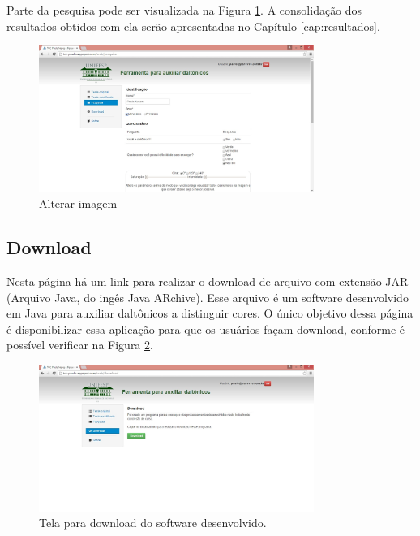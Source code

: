 \documentclass[	12pt, Times, openright, twoside, a4paper, english, brazil]{abntex2}
\begin{document}
Parte da pesquisa pode ser visualizada na Figura \ref{fig:telaPesquisa}. A consolidação dos resultados obtidos com ela serão apresentadas no Capítulo \ref{cap:resultados}.

\begin{figure}[!htb]
\centering \includegraphics[width=0.8\textwidth]{telaPesquisa.jpg}
\caption{Alterar imagem} \label{fig:telaPesquisa}
\end{figure}


\subsection{Download}

Nesta página há um link para realizar o download de arquivo com extensão JAR (Arquivo Java, do ingês Java ARchive). Esse arquivo é um software desenvolvido em Java para auxiliar daltônicos a distinguir cores. O único objetivo dessa página é disponibilizar essa aplicação para que os usuários façam download, conforme é possível verificar na Figura \ref{fig:figuraDownload}.

\begin{figure}[!htb]
\centering \includegraphics[width=0.8\textwidth]{telaDownload.jpg}
\caption{Tela para download do software desenvolvido.} \label{fig:figuraDownload}
\end{figure}
\end{document}
